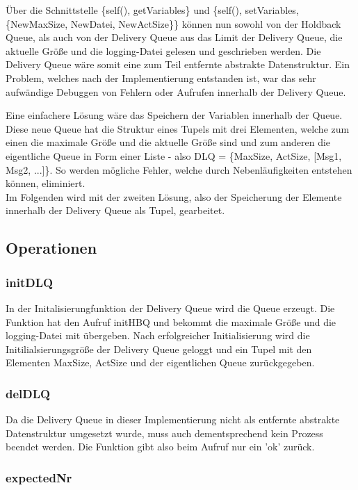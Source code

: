 Über die Schnittstelle \{self(), getVariables\} und \{self(), setVariables, \{NewMaxSize, NewDatei, NewActSize\}\} können nun sowohl von der Holdback Queue, als auch von der Delivery Queue aus das Limit der Delivery Queue, die aktuelle Größe und die logging-Datei gelesen und geschrieben werden. Die Delivery Queue wäre somit eine zum Teil entfernte abstrakte Datenstruktur. 
Ein Problem, welches nach der Implementierung entstanden ist, war das sehr aufwändige Debuggen von Fehlern oder Aufrufen innerhalb der Delivery Queue. 

Eine einfachere Lösung wäre das Speichern der Variablen innerhalb der Queue. 
Diese neue Queue hat die Struktur eines Tupels mit drei Elementen, welche zum einen die maximale Größe und die aktuelle Größe sind und zum anderen die eigentliche Queue in Form einer Liste - also DLQ = \{MaxSize, ActSize, [Msg1, Msg2, ...]\}. So werden mögliche Fehler, welche durch Nebenläufigkeiten entstehen können, eliminiert. \\
Im Folgenden wird mit der zweiten Lösung, also der Speicherung der Elemente innerhalb der Delivery Queue als Tupel, gearbeitet.

\subsection{Operationen}

\subsubsection{initDLQ}

In der Initalisierungfunktion der Delivery Queue wird die Queue erzeugt. Die Funktion hat den Aufruf initHBQ und bekommt die maximale Größe und die logging-Datei mit übergeben. 
Nach erfolgreicher Initialisierung wird die Initilialsierungsgröße der Delivery Queue geloggt und ein Tupel mit den Elementen MaxSize, ActSize und der eigentlichen Queue zurückgegeben.

\subsubsection{delDLQ}

Da die Delivery Queue in dieser Implementierung nicht als entfernte abstrakte Datenstruktur umgesetzt wurde, muss auch dementsprechend kein Prozess beendet werden. Die Funktion gibt also beim Aufruf nur ein 'ok' zurück.

\subsubsection{expectedNr}

